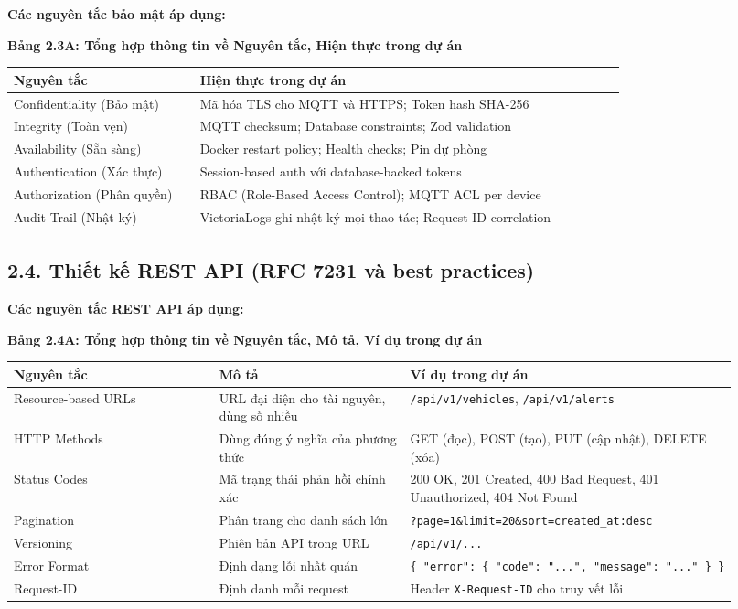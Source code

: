 \documentclass[13pt,a4paper]{extarticle}
\newcounter{none} %
\newcommand{\thesislongtableorignewline}{}
\let\thesislongtableorignewline\\
\renewcommand{\\}{\thesislongtableorignewline\hline}%
\let\\\thesislongtableorignewline
\newcommand{\thesistabletitle}[1]{%
  \begin{center}\textbf{#1}\end{center}%
}
\begin{document}
\textbf{Các nguyên tắc bảo mật áp dụng:}

{\def\LTcaptype{none} %
\thesistabletitle{Bảng 2.3A: Tổng hợp thông tin về Nguyên tắc, Hiện thực trong dự án}

\begin{longtable}{|p{0.28\linewidth}|p{0.64\linewidth}|}
\hline \textbf{Nguyên tắc} & \textbf{Hiện thực trong dự án} \\
\hline
\endhead
\hline
\endlastfoot
Confidentiality (Bảo mật) & Mã hóa TLS cho MQTT và HTTPS; Token hash
SHA-256 \\
Integrity (Toàn vẹn) & MQTT checksum; Database constraints; Zod
validation \\
Availability (Sẵn sàng) & Docker restart policy; Health checks; Pin dự
phòng \\
Authentication (Xác thực) & Session-based auth với database-backed
tokens \\
Authorization (Phân quyền) & RBAC (Role-Based Access Control); MQTT ACL
per device \\
Audit Trail (Nhật ký) & VictoriaLogs ghi nhật ký mọi thao tác;
Request-ID correlation \\
\end{longtable}
}

\subsection{2.4. Thiết kế REST API (RFC 7231 và best
practices)}\label{24-thiux1ebft-kux1ebf-rest-api-rfc-7231-vuxe0-best-practices}

\textbf{Các nguyên tắc REST API áp dụng:}

{\def\LTcaptype{none} %
\thesistabletitle{Bảng 2.4A: Tổng hợp thông tin về Nguyên tắc, Mô tả, Ví dụ trong dự án}

\begin{longtable}{|p{0.30\linewidth}|p{0.28\linewidth}|p{0.34\linewidth}|}
\hline \textbf{Nguyên tắc} & \textbf{Mô tả} & \textbf{Ví dụ trong dự án} \\
\hline
\endhead
\hline
\endlastfoot
Resource-based URLs & URL đại diện cho tài nguyên, dùng số nhiều &
\texttt{/api/v1/vehicles}, \texttt{/api/v1/alerts} \\
HTTP Methods & Dùng đúng ý nghĩa của phương thức & GET (đọc), POST
(tạo), PUT (cập nhật), DELETE (xóa) \\
Status Codes & Mã trạng thái phản hồi chính xác & 200 OK, 201 Created,
400 Bad Request, 401 Unauthorized, 404 Not Found \\
Pagination & Phân trang cho danh sách lớn &
\texttt{?page=1\&limit=20\&sort=created\_at:desc} \\
Versioning & Phiên bản API trong URL & \texttt{/api/v1/...} \\
Error Format & Định dạng lỗi nhất quán &
\texttt{\{\ "error":\ \{\ "code":\ "...",\ "message":\ "..."\ \}\ \}} \\
Request-ID & Định danh mỗi request & Header \texttt{X-Request-ID} cho
truy vết lỗi \\
\end{longtable}
}
\end{document}
